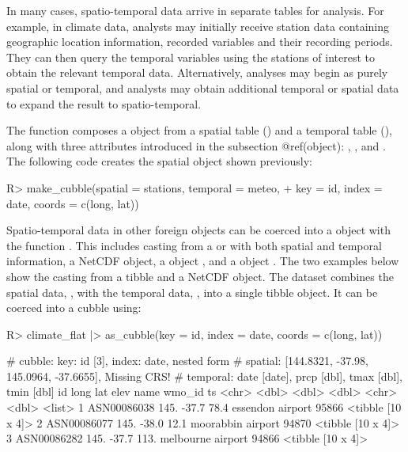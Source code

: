 \documentclass[
]{jss}
\begin{document}
In many cases, spatio-temporal data arrive in separate tables for
analysis. For example, in climate data, analysts may initially receive
station data containing geographic location information, recorded
variables and their recording periods. They can then query the temporal
variables using the stations of interest to obtain the relevant temporal
data. Alternatively, analyses may begin as purely spatial or temporal,
and analysts may obtain additional temporal or spatial data to expand
the result to spatio-temporal.

The function  composes a  object from a
spatial table () and a temporal table (),
along with three attributes introduced in the subsection @ref(object):
, , and . The following code creates
the spatial  object shown previously:

\begin{CodeChunk}
\begin{CodeInput}
R> make_cubble(spatial = stations, temporal = meteo,
+             key = id, index = date, coords = c(long, lat))
\end{CodeInput}
\end{CodeChunk}

Spatio-temporal data in other foreign objects can be coerced into a
 object with the function . This includes
casting from a  or  with both spatial and
temporal information, a NetCDF object, a  object
\citep{stars}, and a  object \citep{sftime}. The two
examples below show the casting from a tibble and a NetCDF object. The
dataset  combines the spatial data, ,
with the temporal data, , into a single tibble object. It
can be coerced into a cubble using:

\begin{CodeChunk}
\begin{CodeInput}
R> climate_flat |> as_cubble(key = id, index = date, coords = c(long, lat))
\end{CodeInput}
\begin{CodeOutput}
# cubble:   key: id [3], index: date, nested form
# spatial:  [144.8321, -37.98, 145.0964, -37.6655], Missing CRS!
# temporal: date [date], prcp [dbl], tmax [dbl], tmin [dbl]
  id           long   lat  elev name              wmo_id ts               
  <chr>       <dbl> <dbl> <dbl> <chr>              <dbl> <list>           
1 ASN00086038  145. -37.7  78.4 essendon airport   95866 <tibble [10 x 4]>
2 ASN00086077  145. -38.0  12.1 moorabbin airport  94870 <tibble [10 x 4]>
3 ASN00086282  145. -37.7 113.  melbourne airport  94866 <tibble [10 x 4]>
\end{CodeOutput}
\end{CodeChunk}
\end{document}
